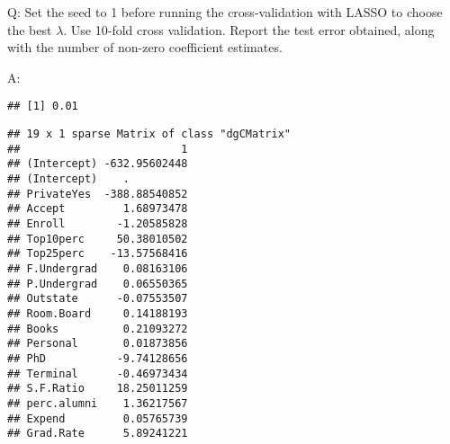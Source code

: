 \documentclass[
]{article}
\newenvironment{Shaded}{\begin{snugshade}}{\end{snugshade}}
\newcommand{\CommentTok}[1]{\textcolor[rgb]{0.56,0.35,0.01}{\textit{#1}}}
\newcommand{\DataTypeTok}[1]{\textcolor[rgb]{0.13,0.29,0.53}{#1}}
\newcommand{\DecValTok}[1]{\textcolor[rgb]{0.00,0.00,0.81}{#1}}
\newcommand{\KeywordTok}[1]{\textcolor[rgb]{0.13,0.29,0.53}{\textbf{#1}}}
\newcommand{\NormalTok}[1]{#1}
\newcommand{\OperatorTok}[1]{\textcolor[rgb]{0.81,0.36,0.00}{\textbf{#1}}}
\newcommand{\StringTok}[1]{\textcolor[rgb]{0.31,0.60,0.02}{#1}}
\begin{document}
Q: Set the seed to 1 before running the cross-validation with LASSO to
choose the best \(\lambda\). Use 10-fold cross validation. Report the
test error obtained, along with the number of non-zero coefficient
estimates.

A:

\begin{Shaded}
\end{Shaded}

\begin{verbatim}
## [1] 0.01
\end{verbatim}

\begin{Shaded}
\end{Shaded}

\begin{verbatim}
## 19 x 1 sparse Matrix of class "dgCMatrix"
##                         1
## (Intercept) -632.95602448
## (Intercept)    .         
## PrivateYes  -388.88540852
## Accept         1.68973478
## Enroll        -1.20585828
## Top10perc     50.38010502
## Top25perc    -13.57568416
## F.Undergrad    0.08163106
## P.Undergrad    0.06550365
## Outstate      -0.07553507
## Room.Board     0.14188193
## Books          0.21093272
## Personal       0.01873856
## PhD           -9.74128656
## Terminal      -0.46973434
## S.F.Ratio     18.25011259
## perc.alumni    1.36217567
## Expend         0.05765739
## Grad.Rate      5.89241221
\end{verbatim}

\begin{Shaded}
\end{Shaded}
\end{document}
